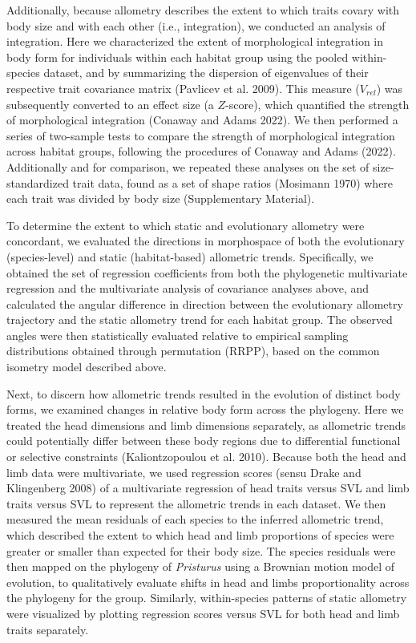\documentclass[
  11pt,
]{article}
\begin{document}
Additionally, because allometry describes the extent to which traits
covary with body size and with each other (i.e., integration), we
conducted an analysis of integration. Here we characterized the extent
of morphological integration in body form for individuals within each
habitat group using the pooled within-species dataset, and by
summarizing the dispersion of eigenvalues of their respective trait
covariance matrix (Pavlicev et al. 2009). This measure (\(V_{rel}\)) was
subsequently converted to an effect size (a \(Z\)-score), which
quantified the strength of morphological integration (Conaway and Adams
2022). We then performed a series of two-sample tests to compare the
strength of morphological integration across habitat groups, following
the procedures of Conaway and Adams (2022). Additionally and for
comparison, we repeated these analyses on the set of size-standardized
trait data, found as a set of shape ratios (Mosimann 1970) where each
trait was divided by body size (Supplementary Material). \hfill\break

To determine the extent to which static and evolutionary allometry were
concordant, we evaluated the directions in morphospace of both the
evolutionary (species-level) and static (habitat-based) allometric
trends. Specifically, we obtained the set of regression coefficients
from both the phylogenetic multivariate regression and the multivariate
analysis of covariance analyses above, and calculated the angular
difference in direction between the evolutionary allometry trajectory
and the static allometry trend for each habitat group. The observed
angles were then statistically evaluated relative to empirical sampling
distributions obtained through permutation (RRPP), based on the common
isometry model described above. \hfill\break

Next, to discern how allometric trends resulted in the evolution of
distinct body forms, we examined changes in relative body form across
the phylogeny. Here we treated the head dimensions and limb dimensions
separately, as allometric trends could potentially differ between these
body regions due to differential functional or selective constraints
(Kaliontzopoulou et al. 2010). Because both the head and limb data were
multivariate, we used regression scores (sensu Drake and Klingenberg
2008) of a multivariate regression of head traits versus SVL and limb
traits versus SVL to represent the allometric trends in each dataset. We
then measured the mean residuals of each species to the inferred
allometric trend, which described the extent to which head and limb
proportions of species were greater or smaller than expected for their
body size. The species residuals were then mapped on the phylogeny of
\emph{Pristurus} using a Brownian motion model of evolution, to
qualitatively evaluate shifts in head and limbs proportionality across
the phylogeny for the group. Similarly, within-species patterns of
static allometry were visualized by plotting regression scores versus
SVL for both head and limb traits separately. \hfill\break
\end{document}
